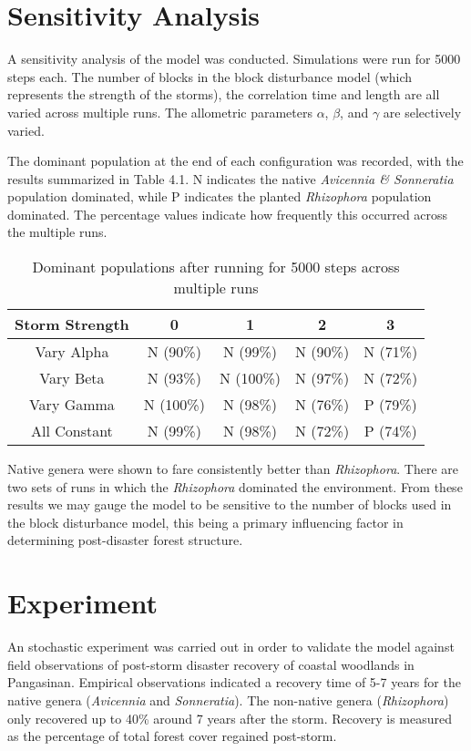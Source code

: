\section{Sensitivity Analysis}

A sensitivity analysis of the model was conducted. Simulations were run for 5000 steps each. The number of blocks in the block disturbance model (which represents the strength of the storms), the correlation time and length are all varied across multiple runs. The allometric parameters $\alpha$, $\beta$, and $\gamma$ are selectively varied.

The dominant population at the end of each configuration was recorded, with the results summarized in Table 4.1. N indicates the native \emph{Avicennia \& Sonneratia} population dominated, while P indicates the planted \emph{Rhizophora} population dominated. The percentage values indicate how frequently this occurred across the multiple runs.
\begin{table}
\begin{tabular}{|c|c|c|c|c|}
\hline 
Storm Strength & 0 & 1 & 2 & 3 \\ 
\hline 
Vary Alpha & N (90\%) & N (99\%) & N (90\%) & N (71\%) \\ 
\hline 
Vary Beta & N (93\%) & N (100\%) & N (97\%) & N (72\%) \\ 
\hline 
Vary Gamma & N (100\%) & N (98\%) & N (76\%) & P (79\%) \\ 
\hline 
All Constant & N (99\%) & N (98\%) & N (72\%) & P (74\%) \\ 
\hline 
\end{tabular}
\caption{Dominant populations after running for 5000 steps across multiple runs}
\end{table}

Native genera were shown to fare consistently better than \emph{Rhizophora}. 
There are two sets of runs in which the \emph{Rhizophora} dominated the
environment. From these results we may gauge the model to be sensitive to the number of blocks used in the block disturbance model, this being a primary influencing factor in determining post-disaster forest structure.

\section{Experiment}

An stochastic experiment was carried out in order to validate the model against 
field observations of post-storm disaster recovery of coastal woodlands in Pangasinan. Empirical observations indicated a recovery time of 5-7 years for the native genera (\textit{Avicennia} and \textit{Sonneratia}). The non-native genera (\textit{Rhizophora}) only recovered up to 40\% around 7 years after the storm. Recovery is measured as the percentage of total forest cover regained post-storm.

